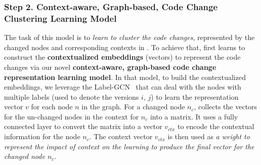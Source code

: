 
\subsubsection{{\bf Step 2. Context-aware, Graph-based, Code Change Clustering Learning Model}} The task of this model is to {\em learn to cluster the code changes}, represented by
the changed nodes and corresponding contexts in {\mvpdg}. To achieve
that, {\tool} first learns to construct the {\bf contextualized
  embeddings} (vectors) to represent the code changes via our novel
{\bf context-aware, graph-based code change representation learning
  model}. In that model, to build the contextualized embeddings, we
leverage
the Label-GCN~\cite{label-gcn} that can deal with the nodes with
multiple labels (used to denote the versions $i$, $j$) to
learn the representation vector $v$ for each node $n$ in the
graph. For a changed node $n_c$, {\tool} collects the vectors for the
un-changed nodes in the context for $n_c$ into a matrix. It uses a
fully connected layer to convert the matrix into a vector $v_{ctx}$ to
encode the contextual information for the node $n_c$. The
context vector $v_{ctx}$ is then used as {\em a weight to represent
  the impact of context on the learning to produce the final vector
  for the changed node $n_c$}.

